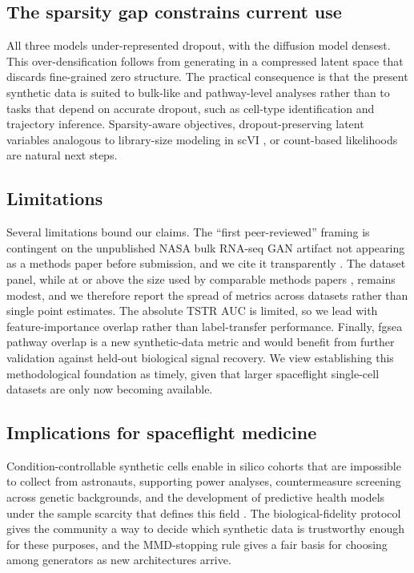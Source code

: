 \documentclass[11pt]{article}
\newcommand{\protname}{biological-fidelity protocol}
\begin{document}
\subsection{The sparsity gap constrains current use}
All three models under-represented dropout, with the diffusion model densest. This over-densification follows from generating in a compressed latent space that discards fine-grained zero structure. The practical consequence is that the present synthetic data is suited to bulk-like and pathway-level analyses rather than to tasks that depend on accurate dropout, such as cell-type identification and trajectory inference. Sparsity-aware objectives, dropout-preserving latent variables analogous to library-size modeling in scVI \cite{scvi}, or count-based likelihoods are natural next steps.

\subsection{Limitations}
Several limitations bound our claims. The ``first peer-reviewed'' framing is contingent on the unpublished NASA bulk RNA-seq GAN artifact not appearing as a methods paper before submission, and we cite it transparently \cite{osdr}. The dataset panel, while at or above the size used by comparable methods papers \cite{cfgen,scdiffusion,cfdiffusion}, remains modest, and we therefore report the spread of metrics across datasets rather than single point estimates. The absolute TSTR AUC is limited, so we lead with feature-importance overlap rather than label-transfer performance. Finally, fgsea pathway overlap is a new synthetic-data metric and would benefit from further validation against held-out biological signal recovery. We view establishing this methodological foundation as timely, given that larger spaceflight single-cell datasets are only now becoming available.

\subsection{Implications for spaceflight medicine}
Condition-controllable synthetic cells enable in silico cohorts that are impossible to collect from astronauts, supporting power analyses, countermeasure screening across genetic backgrounds, and the development of predictive health models under the sample scarcity that defines this field \cite{scott,ilangovan}. The \protname{} gives the community a way to decide which synthetic data is trustworthy enough for these purposes, and the MMD-stopping rule gives a fair basis for choosing among generators as new architectures arrive.
\end{document}
